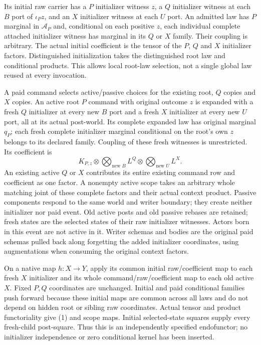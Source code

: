 \documentclass[11pt]{article}
\begin{document}
Its initial raw carrier has a $P$ initializer witness $z$, a $Q$ initializer witness at each $B$ port of $\iota_Pz$, and an $X$ initializer witness at each $U$ port. An admitted law has $P$ marginal in $\mathcal A_P$ and, conditional on each positive $z$, each individual complete attached initializer witness has marginal in its $Q$ or $X$ family. Their coupling is arbitrary. The actual initial coefficient is the tensor of the $P$, $Q$ and $X$ initializer factors. Distinguished initialization takes the distinguished root law and conditional products. This allows local root-law selection, not a single global law reused at every invocation.

A paid command selects active/passive choices for the existing root, $Q$ copies and $X$ copies. An active root $P$ command with original outcome $z$ is expanded with a fresh $Q$ initializer at every new $B$ port and a fresh $X$ initializer at every new $U$ port, all at its actual post-world. Its complete expanded law has original marginal $q_P$; each fresh complete initializer marginal conditional on the root's own $z$ belongs to its declared family. Coupling of these fresh witnesses is unrestricted. Its coefficient is
\[
 K_{P,z}\otimes\bigotimes_{\text{new }B}L^Q\otimes
                         \bigotimes_{\text{new }U}L^X.       \tag{1}
\]
An existing active $Q$ or $X$ contributes its entire existing command row and coefficient as one factor. A nonempty active scope takes an arbitrary whole matching joint of these complete factors and their actual context product. Passive components respond to the same world and writer boundary; they create neither initializer nor paid event. Old active posts and old passive rebases are retained; fresh states are the selected states of their raw initializer witnesses. Actors born in this event are not active in it. Writer schemas and bodies are the original paid schemas pulled back along forgetting the added initializer coordinates, using augmentations when consuming the original context factors.

On a native map $h:X\to Y$, apply its common initial raw/coefficient map to each fresh $X$ initializer and its whole command/raw/coefficient map to each old active $X$. Fixed $P,Q$ coordinates are unchanged. Initial and paid conditional families push forward because these initial maps are common across all laws and do not depend on hidden root or sibling raw coordinates. Actual tensor and product functoriality give (1) and scope maps. Initial selected-state squares supply every fresh-child post-square. Thus this is an independently specified endofunctor; no initializer independence or zero conditional kernel has been inserted.
\end{document}
